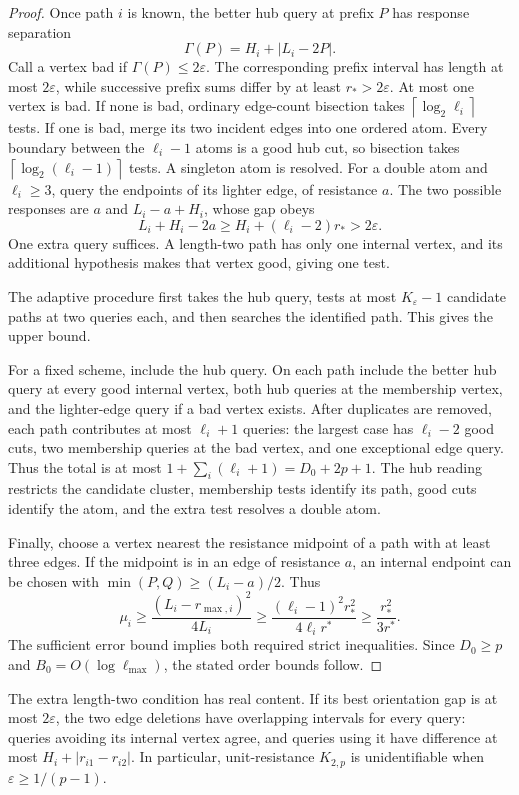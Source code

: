 \documentclass[11pt,letterpaper]{article}
\newcommand{\ceil}[1]{\left\lceil #1\right\rceil}
\begin{document}
\begin{proof}
Once path $i$ is known, the better hub query at prefix $P$ has response separation
\[
 \Gamma(P)=H_i+|L_i-2P|.
\]
Call a vertex bad if $\Gamma(P)\le2\varepsilon$. The corresponding prefix interval has length at most $2\varepsilon$, while successive prefix sums differ by at least $r_*>2\varepsilon$. At most one vertex is bad. If none is bad, ordinary edge-count bisection takes $\ceil{\log_2\ell_i}$ tests. If one is bad, merge its two incident edges into one ordered atom. Every boundary between the $\ell_i-1$ atoms is a good hub cut, so bisection takes $\ceil{\log_2(\ell_i-1)}$ tests. A singleton atom is resolved. For a double atom and $\ell_i\ge3$, query the endpoints of its lighter edge, of resistance $a$. The two possible responses are $a$ and $L_i-a+H_i$, whose gap obeys
\[
 L_i+H_i-2a\ge H_i+(\ell_i-2)r_*>2\varepsilon.
\]
One extra query suffices. A length-two path has only one internal vertex, and its additional hypothesis makes that vertex good, giving one test.

The adaptive procedure first takes the hub query, tests at most $K_\varepsilon-1$ candidate paths at two queries each, and then searches the identified path. This gives the upper bound.

For a fixed scheme, include the hub query. On each path include the better hub query at every good internal vertex, both hub queries at the membership vertex, and the lighter-edge query if a bad vertex exists. After duplicates are removed, each path contributes at most $\ell_i+1$ queries: the largest case has $\ell_i-2$ good cuts, two membership queries at the bad vertex, and one exceptional edge query. Thus the total is at most $1+\sum_i(\ell_i+1)=D_0+2p+1$. The hub reading restricts the candidate cluster, membership tests identify its path, good cuts identify the atom, and the extra test resolves a double atom.

Finally, choose a vertex nearest the resistance midpoint of a path with at least three edges. If the midpoint is in an edge of resistance $a$, an internal endpoint can be chosen with $\min(P,Q)\ge(L_i-a)/2$. Thus
\[
 \mu_i\ge\frac{(L_i-r_{\max,i})^2}{4L_i}
 \ge\frac{(\ell_i-1)^2r_*^2}{4\ell_i r^*}
 \ge\frac{r_*^2}{3r^*}.
\]
The sufficient error bound implies both required strict inequalities. Since $D_0\ge p$ and $B_0=O(\log\ell_{\max})$, the stated order bounds follow.
\end{proof}

The extra length-two condition has real content. If its best orientation gap is at most $2\varepsilon$, the two edge deletions have overlapping intervals for every query: queries avoiding its internal vertex agree, and queries using it have difference at most $H_i+|r_{i1}-r_{i2}|$. In particular, unit-resistance $K_{2,p}$ is unidentifiable when $\varepsilon\ge1/(p-1)$.
\end{document}
